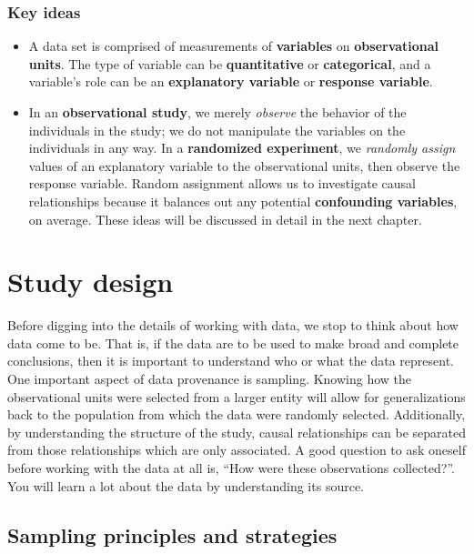 \documentclass[
  10pt,
  openany]{book}
\theoremstyle{definition}
\theoremstyle{definition}
\theoremstyle{definition}
\theoremstyle{definition}
\theoremstyle{remark}
\begin{document}
\subsection*{Key ideas}\label{key-ideas}

\begin{itemize}
\item
  A data set is comprised of measurements of \textbf{variables} on \textbf{observational units}.
  The type of variable can be \textbf{quantitative} or \textbf{categorical}, and a variable's role can be an \textbf{explanatory variable} or \textbf{response variable}.
\item
  In an \textbf{observational study}, we merely \emph{observe} the behavior of the individuals in the study; we do not manipulate the variables on the individuals in any way. In a \textbf{randomized experiment}, we \emph{randomly assign} values of an explanatory variable to the observational units, then observe the response variable. Random assignment allows us to investigate causal relationships because it balances out any potential \textbf{confounding variables}, on average. These ideas will be discussed in detail in the next chapter.
\end{itemize}

\chapter{Study design}\label{data-design}

Before digging into the details of working with data, we stop to think about how data come to be.
That is, if the data are to be used to make broad and complete conclusions, then it is important to understand who or what the data represent.
One important aspect of data provenance is sampling.
Knowing how the observational units were selected from a larger entity will allow for generalizations back to the population from which the data were randomly selected.
Additionally, by understanding the structure of the study, causal relationships can be separated from those relationships which are only associated.
A good question to ask oneself before working with the data at all is, ``How were these observations collected?''.
You will learn a lot about the data by understanding its source.

\section{Sampling principles and strategies}\label{sampling-principles-strategies}
\end{document}
